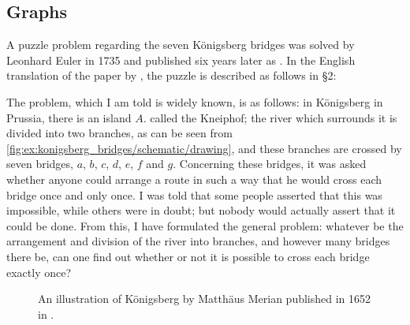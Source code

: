 \subsection{Graphs}\label{subsec:graphs}

\begin{example}\label{ex:konigsberg_bridges}
  A puzzle problem regarding the seven K\"onigsberg bridges was solved by Leonhard Euler in 1735 and published six years later as \cite{Euler1741Bridges}. In the English translation of the paper by , the puzzle is described as follows in \S 2:
  \begin{displayquote}
    The problem, which I am told is widely known, is as follows: in K\"onigsberg in Prussia, there is an island \( A \). called the Kneiphof; the river which surrounds it is divided into two branches, as can be seen from \cref{fig:ex:konigsberg_bridges/schematic/drawing}, and these branches are crossed by seven bridges, \( a \), \( b \), \( c \), \( d \), \( e \), \( f \) and \( g \). Concerning these bridges, it was asked whether anyone could arrange a route in such a way that he would cross each bridge once and only once. I was told that some people asserted that this was impossible, while others were in doubt; but nobody would actually assert that it could be done. From this, I have formulated the general problem: whatever be the arrangement and division of the river into branches, and however many bridges there be, can one find out whether or not it is possible to cross each bridge exactly once?
  \end{displayquote}

  \begin{figure}[ht!]
    \caption{An illustration of K\"onigsberg by Matth\"aus Merian published in 1652 in \cite{Merian1652KönigsbergBridges}.}
    \label{fig:ex:konigsberg_bridges/illustration}
  \end{figure}


\end{example}
